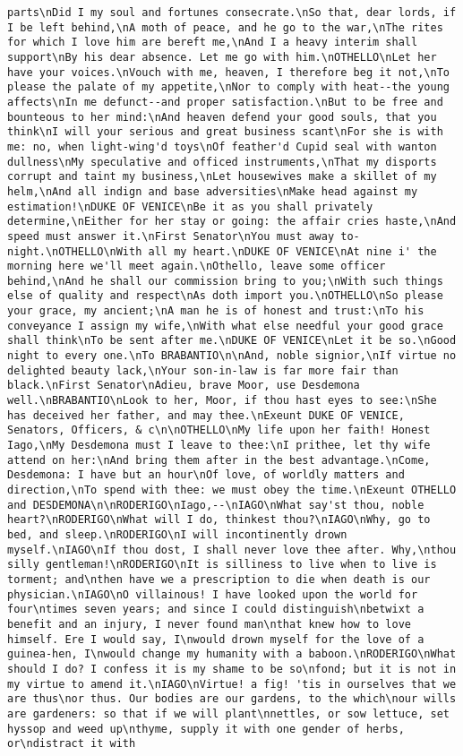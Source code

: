 \begin{verbatim}
parts\nDid I my soul and fortunes consecrate.\nSo that, dear lords, if I be left behind,\nA moth of peace, and he go to the war,\nThe rites for which I love him are bereft me,\nAnd I a heavy interim shall support\nBy his dear absence. Let me go with him.\nOTHELLO\nLet her have your voices.\nVouch with me, heaven, I therefore beg it not,\nTo please the palate of my appetite,\nNor to comply with heat--the young affects\nIn me defunct--and proper satisfaction.\nBut to be free and bounteous to her mind:\nAnd heaven defend your good souls, that you think\nI will your serious and great business scant\nFor she is with me: no, when light-wing'd toys\nOf feather'd Cupid seal with wanton dullness\nMy speculative and officed instruments,\nThat my disports corrupt and taint my business,\nLet housewives make a skillet of my helm,\nAnd all indign and base adversities\nMake head against my estimation!\nDUKE OF VENICE\nBe it as you shall privately determine,\nEither for her stay or going: the affair cries haste,\nAnd speed must answer it.\nFirst Senator\nYou must away to-night.\nOTHELLO\nWith all my heart.\nDUKE OF VENICE\nAt nine i' the morning here we'll meet again.\nOthello, leave some officer behind,\nAnd he shall our commission bring to you;\nWith such things else of quality and respect\nAs doth import you.\nOTHELLO\nSo please your grace, my ancient;\nA man he is of honest and trust:\nTo his conveyance I assign my wife,\nWith what else needful your good grace shall think\nTo be sent after me.\nDUKE OF VENICE\nLet it be so.\nGood night to every one.\nTo BRABANTIO\n\nAnd, noble signior,\nIf virtue no delighted beauty lack,\nYour son-in-law is far more fair than black.\nFirst Senator\nAdieu, brave Moor, use Desdemona well.\nBRABANTIO\nLook to her, Moor, if thou hast eyes to see:\nShe has deceived her father, and may thee.\nExeunt DUKE OF VENICE, Senators, Officers, & c\n\nOTHELLO\nMy life upon her faith! Honest Iago,\nMy Desdemona must I leave to thee:\nI prithee, let thy wife attend on her:\nAnd bring them after in the best advantage.\nCome, Desdemona: I have but an hour\nOf love, of worldly matters and direction,\nTo spend with thee: we must obey the time.\nExeunt OTHELLO and DESDEMONA\n\nRODERIGO\nIago,--\nIAGO\nWhat say'st thou, noble heart?\nRODERIGO\nWhat will I do, thinkest thou?\nIAGO\nWhy, go to bed, and sleep.\nRODERIGO\nI will incontinently drown myself.\nIAGO\nIf thou dost, I shall never love thee after. Why,\nthou silly gentleman!\nRODERIGO\nIt is silliness to live when to live is torment; and\nthen have we a prescription to die when death is our physician.\nIAGO\nO villainous! I have looked upon the world for four\ntimes seven years; and since I could distinguish\nbetwixt a benefit and an injury, I never found man\nthat knew how to love himself. Ere I would say, I\nwould drown myself for the love of a guinea-hen, I\nwould change my humanity with a baboon.\nRODERIGO\nWhat should I do? I confess it is my shame to be so\nfond; but it is not in my virtue to amend it.\nIAGO\nVirtue! a fig! 'tis in ourselves that we are thus\nor thus. Our bodies are our gardens, to the which\nour wills are gardeners: so that if we will plant\nnettles, or sow lettuce, set hyssop and weed up\nthyme, supply it with one gender of herbs, or\ndistract it with 
\end{verbatim}
